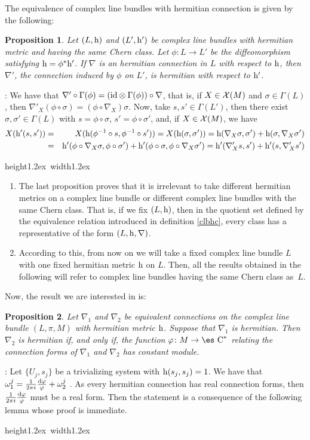 \documentclass[12pt]{article}
\theoremstyle{plain}
\newtheorem{prop}{Proposition}
\def\beann{\begin{eqnarray*}}
\def\eeann{\end{eqnarray*}}
\def\dst{\(}
\def\qed{\ifvmode\removelastskip\fi
{\unskip\nobreak\hfil\penalty50\hbox{}\nobreak\hfil
\hbox{\vrule height1.2ex width1.2ex}\parfillskip=0pt
\finalhyphendemerits=0 \par\smallskip}}
\def\d{{\rm d}}
\def\h{{\rm h}}
\def\Complex{\mbox{\es C}}
\begin{document}
The equivalence of complex line bundles with
hermitian connection is given by the following:

\begin{prop}
Let $(L,\h )$ and $(L',\h ')$ be complex line bundles
with hermitian metric and having the same Chern class.
Let $\phi \colon L \to L'$ be the diffeomorphism
satisfying $\h = \phi^*\h '$.
If $\nabla$ is an hermitian connection in $L$ with
respect to $\h$, then $\nabla '$,
the connection induced by $\phi$ on $L'$,
is hermitian with respect to $\h '$.
\label{llprim}
\end{prop}
: 
We have that
$\nabla ' \circ \Gamma (\phi ) =
({\rm id} \otimes \Gamma (\phi )) \circ \nabla$,
that is, if $X \in {\cal X}(M)$ and
$\sigma \in \Gamma (L)$, then
$\nabla '_X (\phi \circ \sigma ) = (\phi \circ \nabla_X)\sigma$.
Now, take $s,s' \in \Gamma (L')$,
then there exist $\sigma ,\sigma ' \in \Gamma (L)$
with $s = \phi \circ \sigma$,
$s' = \phi \circ \sigma '$,
and, if $X \in {\cal X}(M)$, we have
\beann
X(\h '(s,s'))
&=&
X(\h (\phi^{-1} \circ s,\phi^{-1} \circ s')) =
X(\h (\sigma ,\sigma '))=
\h (\nabla_X \sigma ,\sigma ') + \h (\sigma ,\nabla_X \sigma ')
\\
&=&
\h '(\phi \circ \nabla_X \sigma ,\phi \circ \sigma ') +
\h '(\phi \circ \sigma ,\phi \circ \nabla_X \sigma ')=
\h '(\nabla '_X s,s') + \h '(s,\nabla '_X s')
\eeann
\qed

\begin{enumerate}
\item
The last proposition proves that it is irrelevant
to take different hermitian metrics on a complex line bundle
or different complex line bundles with the same Chern class.
That is, if we fix $(L,\h )$, then in the quotient set
defined by the equivalence relation introduced in definition
\ref{clbhc},
every class has a representative of the form
$(L,\h ,\nabla )$.
\item
According to this, from now on we will take
a fixed complex line bundle $L$ with one fixed
hermitian metric $\h$ on $L$.
Then, all the results obtained in the following will refer to
complex line bundles having the same Chern class as~$L$.
\end{enumerate}

Now, the result we are interested in is:

\begin{prop}
Let $\nabla_1$ and $\nabla_2$ be equivalent connections on the
complex line bundle $(L,\pi ,M)$ with hermitian metric $\h$.
Suppose that $\nabla _1$ is hermitian. Then $\nabla_2$ is
hermitian if, and only if, the function $\varphi \colon M \to
\Complex^*$ relating the connection forms of $\nabla_1$ and
$\nabla_2$ has constant module. \label{ll}
\end{prop}
: 
Let $\{ U_j,s_j \}$ be  a trivializing system
with $\h (s_j,s_j) = 1$.
We have that
\dst \omega^j_1 = \frac{1}{2\pi i}\frac{\d \varphi}{\varphi} +
\omega^j_2\) .
As every hermitian connection has real connection forms,
then \dst\frac{1}{2\pi i}\frac{\d \varphi}{\varphi}\)
must be a real form.
Then the statement is a consequence of the following lemma
whose proof is immediate.
\qed
\end{document}

